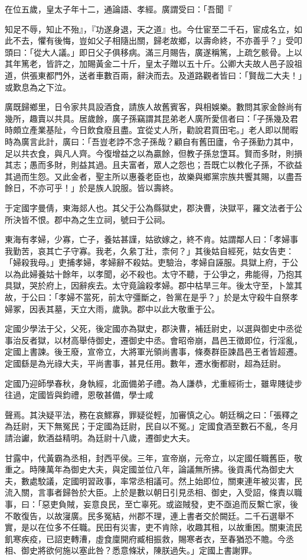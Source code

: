 \begin{pinyinscope}
在位五歲，皇太子年十二，通論語、孝經。廣謂受曰：「吾聞『

知足不辱，知止不殆』，『功遂身退，天之道』也。今仕宦至二千石，宦成名立，如此不去，懼有後悔，豈如父子相隨出關，歸老故鄉，以壽命終，不亦善乎？」受叩頭曰：「從大人議。」即日父子俱移病。滿三月賜告，廣遂稱篤，上疏乞骸骨。上以其年篤老，皆許之，加賜黃金二十斤，皇太子贈以五十斤。公卿大夫故人邑子設祖道，供張東都門外，送者車數百兩，辭決而去。及道路觀者皆曰：「賢哉二大夫！」或歎息為之下泣。

廣既歸鄉里，日令家共具設酒食，請族人故舊賓客，與相娛樂。數問其家金餘尚有幾所，趣賣以共具。居歲餘，廣子孫竊謂其昆弟老人廣所愛信者曰：「子孫幾及君時頗立產業基阯，今日飲食廢且盡。宜從丈人所，勸說君買田宅。」老人即以閒暇時為廣言此計，廣曰：「吾豈老誖不念子孫哉？顧自有舊田廬，令子孫勤力其中，足以共衣食，與凡人齊。今復增益之以為贏餘，但教子孫怠墯耳。賢而多財，則損其志；愚而多財，則益其過。且夫富者，眾人之怨也；吾既亡以教化子孫，不欲益其過而生怨。又此金者，聖主所以惠養老臣也，故樂與鄉黨宗族共饗其賜，以盡吾餘日，不亦可乎！」於是族人說服。皆以壽終。

于定國字曼倩，東海郯人也。其父于公為縣獄史，郡決曹，決獄平，羅文法者于公所決皆不恨。郡中為之生立祠，號曰于公祠。

東海有孝婦，少寡，亡子，養姑甚謹，姑欲嫁之，終不肯。姑謂鄰人曰：「孝婦事我勤苦，哀其亡子守寡。我老，久絫丁壯，柰何？」其後姑自經死，姑女告吏：「婦殺我母。」吏捕孝婦，孝婦辭不殺姑。吏驗治，孝婦自誣服。具獄上府，于公以為此婦養姑十餘年，以孝聞，必不殺也。太守不聽，于公爭之，弗能得，乃抱其具獄，哭於府上，因辭疾去。太守竟論殺孝婦。郡中枯旱三年。後太守至，卜筮其故，于公曰：「孝婦不當死，前太守彊斷之，咎黨在是乎？」於是太守殺牛自祭孝婦冢，因表其墓，天立大雨，歲孰。郡中以此大敬重于公。

定國少學法于父，父死，後定國亦為獄史，郡決曹，補廷尉史，以選與御史中丞從事治反者獄，以材高舉侍御史，遷御史中丞。會昭帝崩，昌邑王徵即位，行淫亂，定國上書諫。後王廢，宣帝立，大將軍光領尚書事，條奏群臣諫昌邑王者皆超遷。定國繇是為光祿大夫，平尚書事，甚見任用。數年，遷水衡都尉，超為廷尉。

定國乃迎師學春秋，身執經，北面備弟子禮。為人謙恭，尤重經術士，雖卑賤徒步往過，定國皆與鈞禮，恩敬甚備，學士咸

聲焉。其決疑平法，務在哀鰥寡，罪疑從輕，加審慎之心。朝廷稱之曰：「張釋之為廷尉，天下無冤民；于定國為廷尉，民自以不冤。」定國食酒至數石不亂，冬月請治讞，飲酒益精明。為廷尉十八歲，遷御史大夫。

甘露中，代黃霸為丞相，封西平侯。三年，宣帝崩，元帝立，以定國任職舊臣，敬重之。時陳萬年為御史大夫，與定國並位八年，論議無所拂。後貢禹代為御史大夫，數處駮議，定國明習政事，率常丞相議可。然上始即位，關東連年被災害，民流入關，言事者歸咎於大臣。上於是數以朝日引見丞相、御史，入受詔，條責以職事，曰：「惡吏負賊，妄意良民，至亡辜死。或盜賊發，吏不亟追而反繫亡家，後不敢復告，以故寖廣。民多冤結，州郡不理，連上書者交於闕廷。二千石選舉不實，是以在位多不任職。民田有災害，吏不肯除，收趣其租，以故重困。關東流民飢寒疾疫，已詔吏轉漕，虛食廩開府臧相振救，賜寒者衣，至春猶恐不贍。今丞相、御史將欲何施以塞此咎？悉意條狀，陳朕過失。」定國上書謝罪。


\end{pinyinscope}
